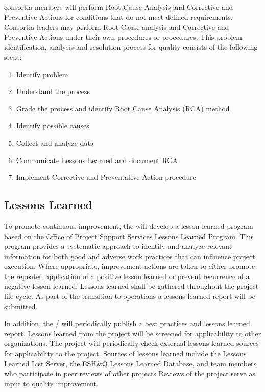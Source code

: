  consortia members will perform Root Cause Analysis and Corrective
and Preventive Actions for conditions that do not meet defined
requirements. Consortia leaders may perform Root Cause analysis and
Corrective and Preventive Actions under their own procedures or
\fnal procedures.  This problem identification, analysis and
resolution process for quality consists of the following steps:
\begin{enumerate}
 \item Identify problem
 \item Understand the process
 \item Grade the process and identify Root Cause Analysis (RCA) method
 \item Identify possible causes
 \item Collect and analyze data
 \item Communicate Lessons Learned and document RCA
 \item Implement Corrective and Preventative Action procedure
\end{enumerate}

\subsection{Lessons Learned}
\label{sec:lessons_learned}

To promote continuous improvement, the   will develop a
lesson learned program based on the \fnal Office of Project Support
Services Lessons Learned Program. This program provides a systematic
approach to identify and analyze relevant information for both good
and adverse work practices that can influence project execution. Where
appropriate, improvement actions are taken to either promote the
repeated application of a positive lesson learned or prevent
recurrence of a negative lesson learned. Lessons learned shall be
gathered throughout the project life cycle. As part of the transition
to operations a lessons learned report will be submitted.

In addition, the /  will
periodically publish a best practices and lessons learned
report. Lessons learned from the  project will be screened
for applicability to other organizations. The  project
will periodically check external lessons learned sources for
applicability to the  project. Sources of lessons learned
include the  Lessons Learned List Server, the \fnal ESH\&Q
Lessons Learned Database, and  team members who
participate in peer reviews of other projects Reviews of the
 project serve as input to quality improvement.

